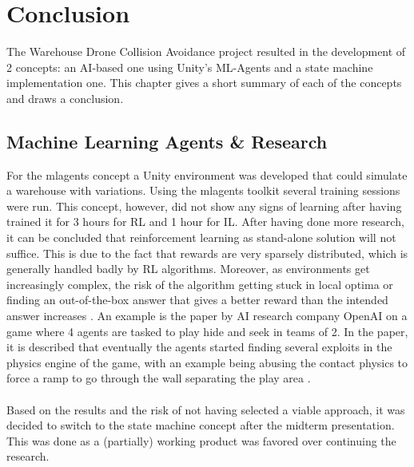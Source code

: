 \chapter{Conclusion}
\label{ch:conclusion}
The Warehouse Drone Collision Avoidance project resulted in the development of 2 concepts: an \gls{AI}-based one using Unity's ML-Agents and a state machine implementation one. This chapter gives a short summary of each of the concepts and draws a conclusion.

\section{Machine Learning Agents \& Research}
For the \gls{mlagents} concept a Unity environment was developed that could simulate a warehouse with variations. Using the \gls{mlagents} toolkit several training sessions were run. This concept, however, did not show any signs of learning after having trained it for 3 hours for \gls{RL} and 1 hour for \gls{IL}. After having done more research, it can be concluded that reinforcement learning as stand-alone solution will not suffice. This is due to the fact that rewards are very sparsely distributed, which is generally handled badly by \gls{RL} algorithms. Moreover, as environments get increasingly complex, the risk of the algorithm getting stuck in local optima or finding an out-of-the-box answer that gives a better reward than the intended answer increases \citep{rlblogpost}. An example is the paper by \gls{AI} research company OpenAI on a game where 4 agents are tasked to play hide and seek in teams of 2. In the paper, it is described that eventually the agents started finding several exploits in the physics engine of the game, with an example being abusing the contact physics to force a ramp to go through the wall separating the play area \citep{hideandseek}.
\\\\
Based on the results and the risk of not having selected a viable approach, it was decided to switch to the state machine concept after the midterm presentation. This was done as a (partially) working product was favored over continuing the research.

